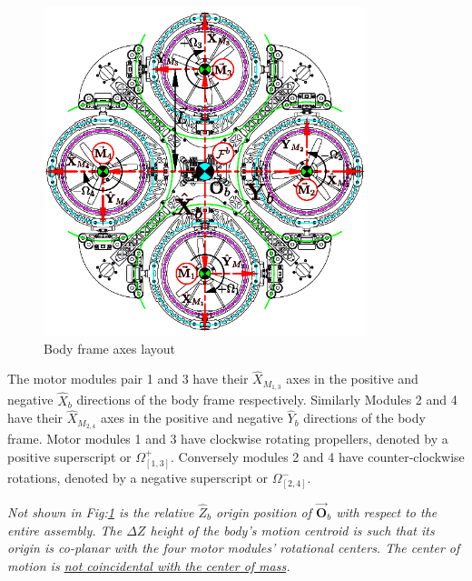 \begin{figure}[htbp]
\vspace{-10pt}
\centering
\includegraphics[width=0.84\textwidth]{figs/body-frame}
\vspace{-12pt}
\caption{Body frame axes layout}
\label{fig:body-frame}
\vspace{-16pt}
\end{figure}
\par
The motor modules pair 1 and 3 have their $\hat{X}_{M_{1,3}}$ axes in the positive and negative $\hat{X}_b$ directions of the body frame respectively. Similarly Modules 2 and 4 have their $\hat{X}_{M_{2,4}}$ axes in the positive and negative $\hat{Y}_b$ directions of the body frame. Motor modules 1 and 3 have clockwise rotating propellers, denoted by a positive superscript or $\Omega_{[1,3]}^{+}$. Conversely modules 2 and 4 have counter-clockwise rotations, denoted by a negative superscript or $\Omega_{[2,4]}^{-}$.
\par
\emph{\color{Gray}Not shown in Fig:\ref{fig:body-frame} is the relative $\hat{Z}_b$ origin position of $\vec{\mathbf{O}}_b$ with respect to the entire assembly. The $\Delta Z$ height of the body's motion centroid is such that its origin is co-planar with the four motor modules' rotational centers. The center of motion is \underline{not coincidental with the center of mass}.}
\par

